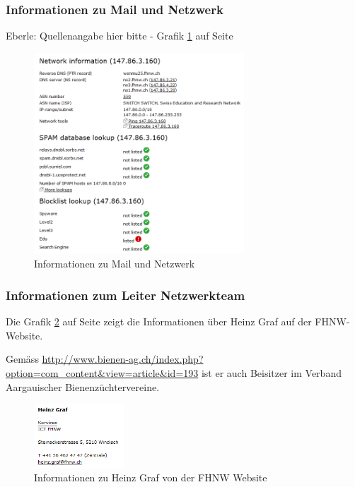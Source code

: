 \documentclass[11pt,a4paper]{scrartcl}
\begin{document}
\subsubsection{Informationen zu Mail und Netzwerk}
Eberle: Quellenangabe hier bitte - Grafik \ref{fig:iprange_infos} auf Seite \pageref{fig:iprange_infos}
\begin{figure}[h]
	\centering
	\includegraphics[width=0.7\textwidth]{../aufg5/iprange_infos.png}
	\caption{Informationen zu Mail und Netzwerk}
	\label{fig:iprange_infos}
\end{figure}

\subsubsection{Informationen zum Leiter Netzwerkteam}
Die Grafik \ref{fig:heinz_graf1} auf Seite \pageref{fig:heinz_graf1} zeigt die Informationen über Heinz Graf auf der FHNW-Website.

Gemäss \url{http://www.bienen-ag.ch/index.php?option=com_content&view=article&id=193} ist er auch Beisitzer im Verband Aargauischer Bienenzüchtervereine.
\begin{figure}[h]
	\centering
	\includegraphics[width=0.3\textwidth]{../aufg5/heinz_graf1.png}
	\caption{Informationen zu Heinz Graf von der FHNW Website}
	\label{fig:heinz_graf1}
\end{figure}
\end{document}
